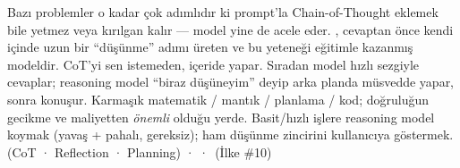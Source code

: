 
 Bazı problemler o kadar çok adımlıdır ki prompt'la Chain-of-Thought
eklemek bile yetmez veya kırılgan kalır --- model yine de acele eder.
 , cevaptan önce kendi içinde uzun bir
``düşünme'' adımı üreten ve bu yeteneği eğitimle kazanmış modeldir. CoT'yi sen
istemeden, içeride yapar.
 Sıradan model hızlı sezgiyle cevaplar; reasoning model ``biraz
düşüneyim'' deyip arka planda müsvedde yapar, sonra konuşur.
 Karmaşık matematik / mantık / planlama / kod; doğruluğun gecikme ve
maliyetten \emph{önemli} olduğu yerde.
 Basit/hızlı işlere reasoning model koymak (yavaş + pahalı, gereksiz);
ham düşünme zincirini kullanıcıya göstermek.
  (CoT · Reflection · Planning) ·  ·  \,{\scriptsize\color{softgray}(İlke \#10)}
